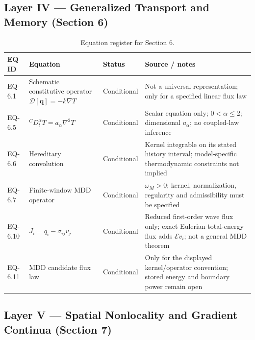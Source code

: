 \subsection{Layer IV — Generalized Transport and Memory (Section 6)}

\begin{table}[htbp]
\centering
\small
\caption{Equation register for Section 6.}
\label{tab:appA-sec6}
\begin{tabularx}{\textwidth}{@{}p{1.6cm}Y p{2.8cm}Y@{}}
\toprule
\textbf{EQ ID} & \textbf{Equation} & \textbf{Status} & \textbf{Source / notes} \\
\midrule
EQ-6.1 & Schematic constitutive operator $\mathcal{D}[\bm q]=-k\nabla T$ & Conditional & Not a universal representation; only for a specified linear flux law \\
EQ-6.5 & ${}^C D_t^\alpha T=a_\alpha\nabla^2T$ & Conditional & Scalar equation only; $0<\alpha\leq2$; dimensional $a_\alpha$; no coupled-law inference \\
EQ-6.6 & Hereditary convolution & Conditional & Kernel integrable on its stated history interval; model-specific thermodynamic constraints not implied \\
EQ-6.7 & Finite-window MDD operator & Conditional & $\omega_M>0$; kernel, normalization, regularity and admissibility must be specified \\
EQ-6.10 & $J_i=q_i-\sigma_{ij}v_j$ & Conditional & Reduced first-order wave flux only; exact Eulerian total-energy flux adds $\mathcal{E}v_i$; not a general MDD theorem \\
EQ-6.11 & MDD candidate flux law & Conditional & Only for the displayed kernel/operator convention; stored energy and boundary power remain open \\
\bottomrule
\end{tabularx}
\end{table}

\subsection{Layer V — Spatial Nonlocality and Gradient Continua (Section 7)}

